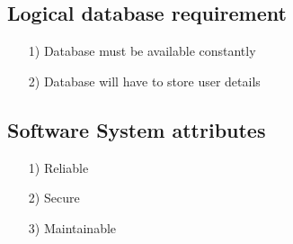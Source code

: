 \documentclass[10pt,a4paper]{article}
\begin{document}
\subsection{Logical database requirement}

\begin{itemize}

\item[1)]
Database must be available constantly

\item[2)]
Database will have to store user details

\end{itemize}



\subsection{Software System attributes}

\begin{itemize}
\item[1)]
Reliable
\item[2)]
Secure
\item[3)]
Maintainable
\end{itemize}
\end{document}
